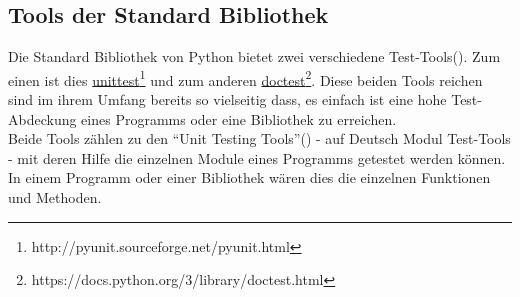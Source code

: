\subsection{Tools der Standard Bibliothek}\label{python-tools:stdlib}

Die Standard Bibliothek von Python bietet zwei verschiedene Test-Tools(\cite{wiki.python:PythonTestingToolsTaxonomy}).
Zum einen ist dies
\href{http://pyunit.sourceforge.net/pyunit.html}{unittest}\footnote{http://pyunit.sourceforge.net/pyunit.html}
und zum anderen
\href{https://docs.python.org/3/library/doctest.html}{doctest}\footnote{https://docs.python.org/3/library/doctest.html}.
Diese beiden Tools reichen sind im ihrem Umfang bereits so vielseitig dass, es einfach ist eine hohe Test-Abdeckung eines Programms oder eine Bibliothek zu erreichen.
\newline
\\
Beide Tools zählen zu den "`Unit Testing Tools"'(\cite{wiki.python:PythonTestingToolsTaxonomy}) -
auf Deutsch Modul Test-Tools - mit deren Hilfe die einzelnen Module eines Programms
getestet werden können. In einem Programm oder einer Bibliothek wären dies die einzelnen
Funktionen und Methoden.